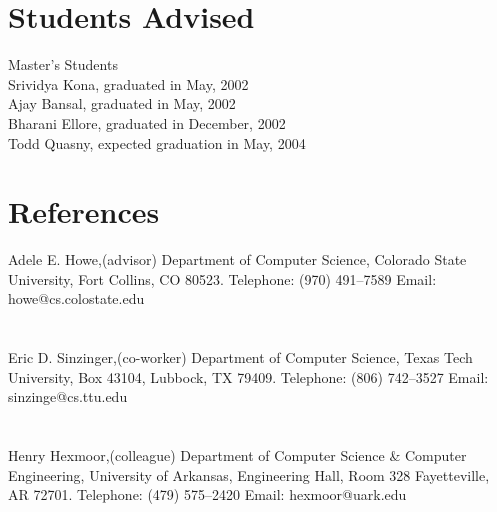 \documentclass[11pt]{resume}
\begin{document}
\section{Students Advised}{Master's Students}
{\\Srividya Kona, graduated in May, 2002\\
  Ajay Bansal, graduated in May, 2002\\
  Bharani Ellore, graduated in December, 2002\\
  Todd Quasny, expected graduation in May, 2004
}



\section{References}{Adele E. Howe,}{(advisor) Department of Computer
  Science, Colorado State University, Fort Collins, CO 80523.  Telephone:
  (970) 491--7589 Email: howe@cs.colostate.edu}

\section{}{Eric D. Sinzinger,}{(co-worker) Department of Computer Science, 
  Texas Tech University, Box 43104, Lubbock, TX 79409. Telephone: (806)
  742--3527 Email: sinzinge@cs.ttu.edu}

\section{}{Henry Hexmoor,}{(colleague) Department of Computer Science 
  \& Computer Engineering, University of Arkansas, Engineering Hall, Room 328
  Fayetteville, AR 72701.  Telephone: (479) 575--2420
  Email: hexmoor@uark.edu }
\end{document}
